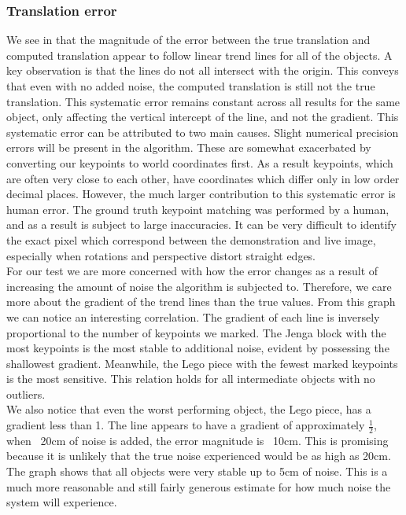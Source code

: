 \subsubsection{Translation error}
We see in  that the magnitude of the error between the true translation and computed translation appear to follow linear trend lines for all of the objects. A key observation is that the lines do not all intersect with the origin. This conveys that even with no added noise, the computed translation is still not the true translation. This systematic error remains constant across all results for the same object, only affecting the vertical intercept of the line, and not the gradient. This systematic error can be attributed to two main causes. Slight numerical precision errors will be present in the algorithm. These are somewhat exacerbated by converting our keypoints to world coordinates first. As a result keypoints, which are often very close to each other, have coordinates which differ only in low order decimal places. However, the much larger contribution to this systematic error is human error. The ground truth keypoint matching was performed by a human, and as a result is subject to large inaccuracies. It can be very difficult to identify the exact pixel which correspond between the demonstration and live image, especially when rotations and perspective distort straight edges.\\

For our test we are more concerned with how the error changes as a result of increasing the amount of noise the algorithm is subjected to. Therefore, we care more about the gradient of the trend lines than the true values. From this graph we can notice an interesting correlation. The gradient of each line is inversely proportional to the number of keypoints we marked. The Jenga block with the most keypoints is the most stable to additional noise, evident by possessing the shallowest gradient. Meanwhile, the Lego piece with the fewest marked keypoints is the most sensitive. This relation holds for all intermediate objects with no outliers.\\

We also notice that even the worst performing object, the Lego piece, has a gradient less than 1. The line appears to have a gradient of approximately $\frac{1}{2}$, when ~20cm of noise is added, the error magnitude is ~10cm. This is promising because it is unlikely that the true noise experienced would be as high as 20cm. The graph shows that all objects were very stable up to 5cm of noise. This is a much more reasonable and still fairly generous estimate for how much noise the system will experience.\\

